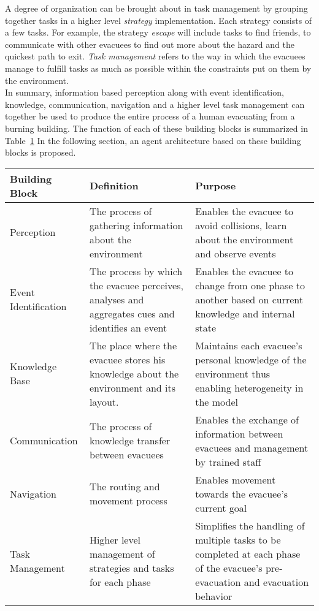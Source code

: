 	A degree of organization can be brought about in task management by grouping together tasks in a higher level \emph{strategy} implementation. Each strategy consists of a few tasks. For example, the strategy \emph{escape} will include tasks to find friends, to communicate with other evacuees to find out more about the hazard and the quickest path to exit. \emph{Task management} refers to the way in which the evacuees manage to fulfill tasks as much as possible within the constraints put on them by the environment.\\


In summary, information based perception along with event identification, knowledge, communication, navigation and a higher level task management can together be used to produce the entire process of a human evacuating from a burning building. The function of each of these building blocks is summarized in Table~\ref{tab:BuildingBlocks} In the following section, an agent architecture based on these building blocks is proposed.

\begin{table}[tbp]
\centering
{} %
\begin{tabular}{p{1.0in}   p{2.1in}   p{2.4in}} %
\hline\hline %
Building Block & Definition & Purpose \\
\hline
Perception  & The process of gathering information about the environment &  Enables the evacuee to avoid collisions, learn about the environment and observe events\\[3pt]
Event Identification & The process by which the evacuee perceives, analyses and aggregates cues and identifies an event  & Enables the evacuee to change from one phase to another based on current knowledge and internal state\\[3pt]
Knowledge Base & The place where the evacuee stores his knowledge about the environment and its layout. & Maintains each evacuee's personal knowledge of the environment thus enabling heterogeneity in the model \\[3pt]
Communication & The process of knowledge transfer between evacuees & Enables the exchange of information between evacuees and management by trained staff \\[3pt]
Navigation & The routing and movement process & Enables movement towards the evacuee's current goal \\[3pt]
Task Management & Higher level management of strategies and tasks for each phase & Simplifies the handling of multiple tasks to be completed at each phase of the evacuee's pre-evacuation and evacuation behavior \\[3pt]
\bottomrule
\end{tabular}
\label{tab:BuildingBlocks}
\end{table}

